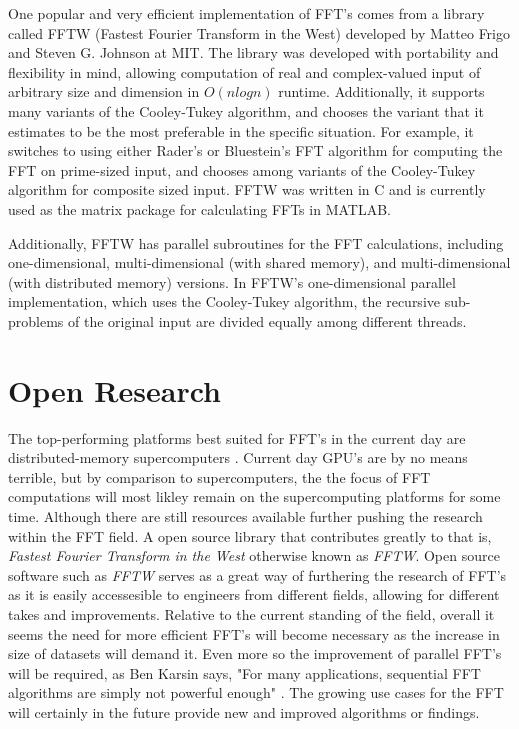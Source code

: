 \documentclass[journal]{IEEEtran}
\begin{document}
	\cite{Beaudoin}
	\par{
		One popular and very efficient implementation of FFT's comes from a library
		called FFTW (Fastest Fourier Transform in the West) developed by Matteo 
		Frigo and Steven G. Johnson at MIT. The library was developed with
		portability and flexibility in mind, allowing computation of real and
		complex-valued input of arbitrary size and dimension in $O(nlogn)$ runtime.
		Additionally, it supports many variants of the Cooley-Tukey algorithm,
		and chooses the variant that it estimates to be the most preferable in
		the specific situation. For example, it switches to using either Rader's
		or Bluestein's FFT algorithm for computing the FFT on prime-sized input, and
		chooses among variants of the Cooley-Tukey algorithm for composite sized
		input. FFTW was written in C and is currently used as the matrix package
		for calculating FFTs in MATLAB.

		Additionally, FFTW has parallel subroutines for the FFT calculations,
		including one-dimensional, multi-dimensional (with shared memory), and
		multi-dimensional (with distributed memory) versions. In FFTW's
		one-dimensional parallel implementation, which uses the Cooley-Tukey
		algorithm, the recursive sub-problems of the original input are divided
		equally among different threads.
		\cite{FFTW}
	}
\section{Open Research}
	\par{
		The top-performing platforms best suited for FFT's in the current day are 
		distributed-memory supercomputers \cite{FFTLitReview}. Current day GPU's 
		are by no means terrible, but by comparison to supercomputers, the   
		the focus of FFT computations will most likley remain on the supercomputing 
		platforms for some time. Although there are still resources available further 
		pushing the research within the FFT field. A open source library that contributes 
		greatly to that is, \textit{Fastest Fourier Transform in the West} otherwise 
		known as \textit{FFTW}. Open source software such as \textit{FFTW} serves as a great 
		way of furthering the research of FFT's as it is easily accessesible to engineers 
		from different fields, allowing for different takes and improvements. Relative to the 
		current standing of the field, overall it seems the need for more efficient FFT's 
		will become necessary as the increase in size of datasets will demand it. Even more so 
		the improvement of parallel FFT's will be required, as Ben Karsin says,
		"For many applications, sequential FFT algorithms are simply not powerful enough" \cite{FFTLitReview}.
		The growing use cases for the FFT will certainly in the future provide new and improved 
		algorithms or findings.
	}
\end{document}
